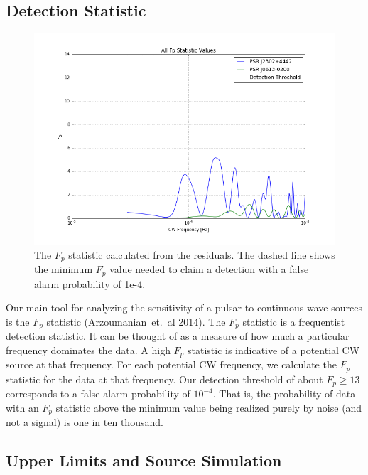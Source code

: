 \documentclass[12pt]{article}
\begin{document}
\subsection{Detection Statistic}

\begin{figure}[h!]
\caption{The $F_p$ statistic calculated from the residuals. The dashed line shows
    the minimum $F_p$ value needed to claim a detection with a false alarm probability
    of 1e-4.}
\includegraphics[width=\textwidth]{./figures/both_fp.png}
\end{figure}

    Our main tool for analyzing the sensitivity of a pulsar to continuous wave
sources is the $F_p$ statistic (Arzoumanian~et.~al
2014). The
$F_p$ statistic is a frequentist detection statistic. It can be thought of as a
measure of how much a particular frequency dominates the data. A high $F_p$
statistic is indicative of a potential CW source at that frequency. For each
potential CW frequency, we calculate the $F_p$ statistic for the data at that
frequency. Our detection threshold of about $F_p \geq 13$ corresponds to a false
alarm probability of $10^{-4}$. That is, the probability of data with an $F_p$
statistic above the minimum value being realized purely by noise (and not a
signal) is one in ten thousand.

\subsection{Upper Limits and Source Simulation}
\end{document}
